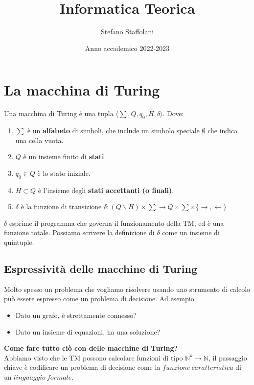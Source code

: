 \documentclass[a4paper, 12pt]{article}
\title{Informatica Teorica}
\author{Stefano Staffolani}
\date{ Anno accademico 2022-2023}
\begin{document}
\maketitle
\tableofcontents
\newpage
\section{La macchina di Turing}
Una macchina di Turing \`e una tupla $\langle \sum, Q,q_0,H,\delta\rangle$. Dove: 
\begin{enumerate}
\item $\sum$ \`e un \textbf{alfabeto} di simboli, che include un simbolo speciale $\emptyset$ che indica una cella vuota.
\item $Q$ \`e un insieme finito di \textbf{stati}.
\item $q_0 \in Q$ \`e lo stato iniziale.
\item $H \subset Q$ \`e l'insieme degli \textbf{stati accettanti (o finali)}.
\item $\delta$ \`e la funzione di transizione $\delta: (Q \backslash H) \times \sum \rightarrow Q \times \sum \times \{ \rightarrow, \leftarrow \} $
\end{enumerate}
$\delta$ esprime il programma che governa il funzionamento della TM, ed \`e una funzione totale. Possiamo scrivere la definizione di $\delta$ come un insieme di quintuple.
\subsection{Espressivit\`a delle macchine di Turing}
Molto spesso un problema che vogliamo risolvere usando uno strumento di calcolo pu\`o essere espresso come un problema di decisione. Ad esempio\begin{itemize}
\item Dato un grafo, \`e strettamente connesso?
\item Dato un insieme di equazioni, ha una soluzione?
\end{itemize}
\textbf{Come fare tutto ci\`o con delle macchine di Turing?}\\
Abbiamo visto che le TM possono calcolare funzioni di tipo $\mathbb{N}^{k} \rightarrow \mathbb{N}$, il passaggio chiave \`e codificare un problema di decisione come la $funzione\ caratteristica$ di un $linguaggio\ formale$.
\end{document}
